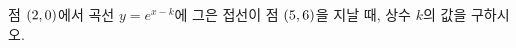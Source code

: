 점 $(2{,}\mkern3mu\mathopen{}0)$에서 곡선 $y=e^{x-k}$에 그은 접선이 점 $(5{,}\mkern3mu\mathopen{}6)$을 지날 때, 상수 $k$의 값을 구하시오.
